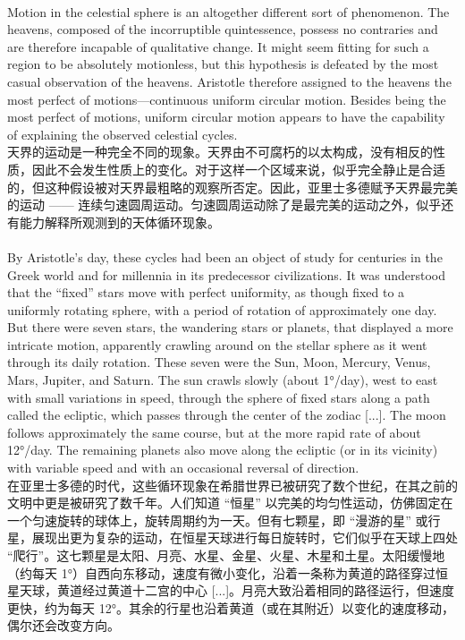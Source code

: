 \documentclass{article}
\begin{document}
\\
Motion in the celestial sphere is an altogether different sort of phenomenon. The heavens, composed of the incorruptible quintessence, possess no contraries and are therefore incapable of qualitative change. It might seem fitting for such a region to be absolutely motionless, but this hypothesis is defeated by the most casual observation of the heavens. Aristotle therefore assigned to the heavens the most perfect of motions—continuous uniform circular motion. Besides being the most perfect of motions, uniform circular motion appears to have the capability of explaining the observed celestial cycles.\\
天界的运动是一种完全不同的现象。天界由不可腐朽的以太构成，没有相反的性质，因此不会发生性质上的变化。对于这样一个区域来说，似乎完全静止是合适的，但这种假设被对天界最粗略的观察所否定。因此，亚里士多德赋予天界最完美的运动 —— 连续匀速圆周运动。匀速圆周运动除了是最完美的运动之外，似乎还有能力解释所观测到的天体循环现象。\\

\\
By Aristotle’s day, these cycles had been an object of study for centuries in the Greek world and for millennia in its predecessor civilizations. It was understood that the “fixed” stars move with perfect uniformity, as though fixed to a uniformly rotating sphere, with a period of rotation of approximately one day. But there were seven stars, the wandering stars or planets, that displayed a more intricate motion, apparently crawling around on the stellar sphere as it went through its daily rotation. These seven were the Sun, Moon, Mercury, Venus, Mars, Jupiter, and Saturn. The sun crawls slowly (about 1°/day), west to east with small variations in speed, through the sphere of fixed stars along a path called the ecliptic, which passes through the center of the zodiac [...]. The moon follows approximately the same course, but at the more rapid rate of about 12°/day. The remaining planets also move along the ecliptic (or in its vicinity) with variable speed and with an occasional reversal of direction.\\
在亚里士多德的时代，这些循环现象在希腊世界已被研究了数个世纪，在其之前的文明中更是被研究了数千年。人们知道 “恒星” 以完美的均匀性运动，仿佛固定在一个匀速旋转的球体上，旋转周期约为一天。但有七颗星，即 “漫游的星” 或行星，展现出更为复杂的运动，在恒星天球进行每日旋转时，它们似乎在天球上四处 “爬行”。这七颗星是太阳、月亮、水星、金星、火星、木星和土星。太阳缓慢地（约每天 1°）自西向东移动，速度有微小变化，沿着一条称为黄道的路径穿过恒星天球，黄道经过黄道十二宫的中心 [...]。月亮大致沿着相同的路径运行，但速度更快，约为每天 12°。其余的行星也沿着黄道（或在其附近）以变化的速度移动，偶尔还会改变方向。\\
\end{document}
